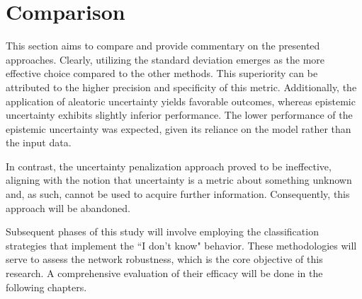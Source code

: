 \section{Comparison}

This section aims to compare and provide commentary on the presented approaches. Clearly, utilizing the standard deviation emerges as the more effective choice compared to the other methods. This superiority can be attributed to the higher precision and specificity of this metric. Additionally, the application of aleatoric uncertainty yields favorable outcomes, whereas epistemic uncertainty exhibits slightly inferior performance. The lower performance of the epistemic uncertainty was expected, given its reliance on the model rather than the input data.

In contrast, the uncertainty penalization approach proved to be ineffective, aligning with the notion that uncertainty is a metric about something unknown and, as such, cannot be used to acquire further information. Consequently, this approach will be abandoned.

Subsequent phases of this study will involve employing the classification strategies that implement the ``I don't know" behavior. These methodologies will serve to assess the network robustness, which is the core objective of this research. A comprehensive evaluation of their efficacy will be done in the following chapters.